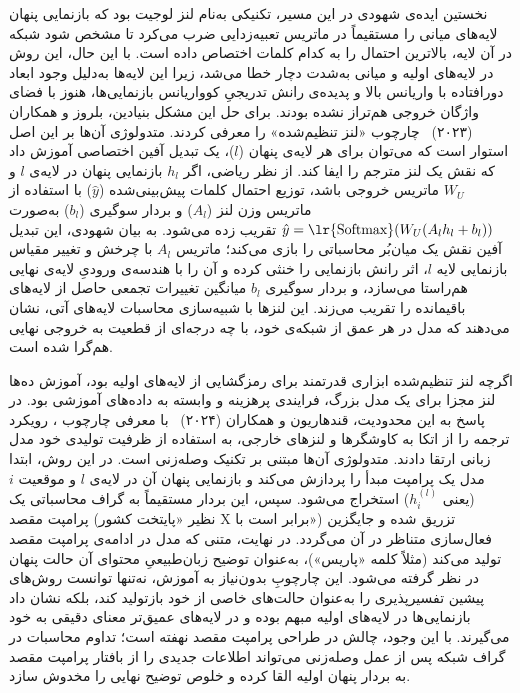 نخستین ایده‌ی شهودی در این مسیر، تکنیکی به‌نام لنز لوجیت بود که بازنمایی پنهان لایه‌های میانی را مستقیماً در ماتریس تعبیه‌زدایی ضرب می‌کرد تا مشخص شود شبکه در آن لایه، بالاترین احتمال را به کدام کلمات اختصاص داده است. با این حال، این روش در لایه‌های اولیه و میانی به‌شدت دچار خطا می‌شد، زیرا این لایه‌ها به‌دلیل وجود ابعاد دورافتاده با واریانس بالا و پدیده‌ی رانش تدریجیِ کوواریانس بازنمایی‌ها، هنوز با فضای واژگان خروجی هم‌تراز نشده بودند. برای حل این مشکل بنیادین، بلروز و همکاران (۲۰۲۳)~\cite{belrose2023eliciting} چارچوب «لنز تنظیم‌شده» را معرفی کردند. متدولوژی آن‌ها بر این اصل استوار است که می‌توان برای هر لایه‌ی پنهان ($l$)، یک تبدیل آفین اختصاصی آموزش داد که نقش یک لنز مترجم را ایفا کند. از نظر ریاضی، اگر $h_l$ بازنمایی پنهان در لایه‌ی $l$ و $W_U$ ماتریس خروجی باشد، توزیع احتمال کلمات پیش‌بینی‌شده ($\hat{y}$) با استفاده از ماتریس وزن لنز ($A_l$) و بردار سوگیری ($b_l$) به‌صورت $\hat{y} = \text{\lr{Softmax}}(W_U (A_l h_l + b_l))$ تقریب زده می‌شود. به بیان شهودی، این تبدیل آفین نقش یک میان‌بُر محاسباتی را بازی می‌کند؛ ماتریس $A_l$ با چرخش و تغییر مقیاس بازنمایی لایه $l$، اثر رانش بازنمایی را خنثی کرده و آن را با هندسه‌ی ورودیِ لایه‌ی نهایی هم‌راستا می‌سازد، و بردار سوگیری $b_l$ میانگین تغییرات تجمعی حاصل از لایه‌های باقیمانده را تقریب می‌زند. این لنزها با شبیه‌سازی محاسبات لایه‌های آتی، نشان می‌دهند که مدل در هر عمق از شبکه‌ی خود، با چه درجه‌ای از قطعیت به خروجی نهایی هم‌گرا شده است.

اگرچه لنز تنظیم‌شده ابزاری قدرتمند برای رمزگشایی از لایه‌های اولیه بود، آموزش ده‌ها لنز مجزا برای یک مدل بزرگ، فرایندی پرهزینه و وابسته به داده‌های آموزشی بود. در پاسخ به این محدودیت، قندهاریون و همکاران (۲۰۲۴)~\cite{ghandeharioun2024patchscopes} با معرفی چارچوب ، رویکرد ترجمه را از اتکا به کاوشگرها و لنزهای خارجی، به استفاده از ظرفیت تولیدی خود مدل زبانی ارتقا دادند. متدولوژی آن‌ها مبتنی بر تکنیک وصله‌زنی است. در این روش، ابتدا مدل یک پرامپت مبدأ را پردازش می‌کند و بازنمایی پنهان آن در لایه‌ی $l$ و موقعیت $i$ (یعنی $h_i^{(l)}$) استخراج می‌شود. سپس، این بردار مستقیماً به گراف محاسباتی یک پرامپت مقصد (نظیر «پایتخت کشور X برابر است با») تزریق شده و جایگزین فعال‌سازی متناظر در آن می‌گردد. در نهایت، متنی که مدل در ادامه‌ی پرامپت مقصد تولید می‌کند (مثلاً کلمه «پاریس»)، به‌عنوان توضیح زبان‌طبیعیِ محتوای آن حالت پنهان در نظر گرفته می‌شود. این چارچوبِ بدون‌نیاز به آموزش، نه‌تنها توانست روش‌های پیشین تفسیرپذیری را به‌عنوان حالت‌های خاصی از خود بازتولید کند، بلکه نشان داد بازنمایی‌ها در لایه‌های اولیه مبهم بوده و در لایه‌های عمیق‌تر معنای دقیقی به خود می‌گیرند. با این وجود، چالش  در طراحی پرامپت مقصد نهفته است؛ تداوم محاسبات در گراف شبکه پس از عمل وصله‌زنی می‌تواند اطلاعات جدیدی را از بافتار پرامپت مقصد به بردار پنهان اولیه القا کرده و خلوص توضیح نهایی را مخدوش سازد.

